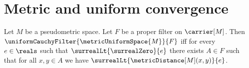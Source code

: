 


\section{Metric and uniform convergence}

\begin{theorem}\label{metric_uniform_cauchy_filter_iff}
    Let $M$ be a pseudometric space.
    Let $F$ be a proper filter on $\carrier[M]$.
    Then $\uniformCauchyFilter{\metricUniformSpace{M}}{F}$ iff
        for every $e\in\reals$ such that
            $\surrealLt{\surrealZero}{e}$ there exists $A\in F$ such that
            for all $x,y\in A$ we have
                $\surrealLt{\metricDistance[M](x,y)}{e}$.
\end{theorem}
